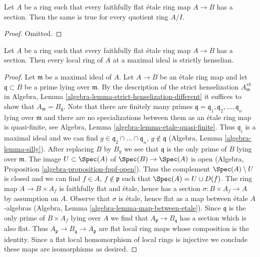 \begin{lemma}
\label{lemma-have-sections-quotient}
Let $A$ be a ring such that every faithfully flat \'etale ring map
$A \to B$ has a section. Then the same is true for every quotient ring
$A/I$.
\end{lemma}

\begin{proof}
Omitted.
\end{proof}

\begin{lemma}
\label{lemma-have-sections-strictly-henselian}
Let $A$ be a ring such that every faithfully flat \'etale ring map
$A \to B$ has a section. Then every local ring of $A$ at a maximal
ideal is strictly henselian.
\end{lemma}

\begin{proof}
Let $\mathfrak m$ be a maximal ideal of $A$. Let $A \to B$ be an
\'etale ring map and let $\mathfrak q \subset B$ be a prime
lying over $\mathfrak m$. By the description of the strict henselization
$A_\mathfrak m^{sh}$ in
Algebra, Lemma \ref{algebra-lemma-strict-henselization-different}
it suffices to show that $A_\mathfrak m = B_\mathfrak q$.
Note that there are finitely many primes
$\mathfrak q = \mathfrak q_1, \mathfrak q_2, \ldots, \mathfrak q_n$
lying over $\mathfrak m$ and there are no specializations
between them as an \'etale ring map is quasi-finite, see
Algebra, Lemma \ref{algebra-lemma-etale-quasi-finite}.
Thus $\mathfrak q_i$ is a maximal ideal and we can find
$g \in \mathfrak q_2 \cap \ldots \cap \mathfrak q_n$, $g \not \in \mathfrak q$
(Algebra, Lemma \ref{algebra-lemma-silly}).
After replacing $B$ by $B_g$ we see that $\mathfrak q$
is the only prime of $B$ lying over $\mathfrak m$.
The image $U \subset \Spec(A)$ of $\Spec(B) \to \Spec(A)$ is
open (Algebra, Proposition \ref{algebra-proposition-fppf-open}).
Thus the complement $\Spec(A) \setminus U$ is closed
and we can find $f \in A$, $f \not \in \mathfrak p$ such that
$\Spec(A) = U \cup D(f)$. The ring map $A \to B \times A_f$
is faithfully flat and \'etale, hence has a section
$\sigma : B \times A_f \to A$ by assumption on $A$.
Observe that $\sigma$ is \'etale, hence flat as a map between \'etale
$A$-algebras (Algebra, Lemma \ref{algebra-lemma-map-between-etale}).
Since $\mathfrak q$ is the only prime of $B \times A_f$ lying
over $A$ we find that $A_\mathfrak p \to B_\mathfrak q$ has
a section which is also flat. Thus
$A_\mathfrak p \to B_\mathfrak q \to A_\mathfrak p$
are flat local ring maps whose composition is the identity. Since
a flat local homomorphism of local rings is injective we conclude these
maps are isomorphisms as desired.
\end{proof}


